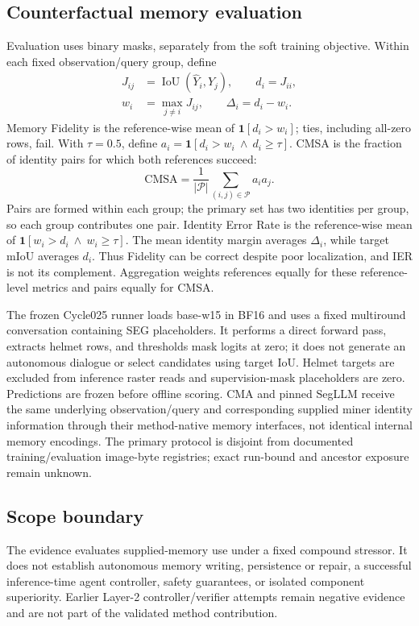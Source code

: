 \subsection{Counterfactual memory evaluation}
Evaluation uses binary masks, separately from the soft training objective.
Within each fixed observation/query group, define
\begin{align}
 J_{ij}&=\operatorname{IoU}(\hat Y_i,Y_j),\qquad d_i=J_{ii},\\
 w_i&=\max_{j\ne i}J_{ij},\qquad \Delta_i=d_i-w_i.
\end{align}
Memory Fidelity is the reference-wise mean of $\mathbf{1}[d_i>w_i]$;
ties, including all-zero rows, fail. With $\tau=0.5$, define
$a_i=\mathbf{1}[d_i>w_i\ \land\ d_i\geq\tau]$.
CMSA is the fraction of identity pairs for which both references succeed:
\begin{equation}
 \mathrm{CMSA}=\frac{1}{|\mathcal P|}
 \sum_{(i,j)\in\mathcal P}a_i a_j.
\end{equation}
Pairs are formed within each group; the primary set has two identities per
group, so each group contributes one pair. Identity Error Rate is the
reference-wise mean of $\mathbf{1}[w_i>d_i\ \land\ w_i\geq\tau]$.
The mean identity margin averages $\Delta_i$, while target mIoU averages $d_i$.
Thus Fidelity can be correct despite poor localization, and IER is not its
complement. Aggregation weights references equally for these reference-level
metrics and pairs equally for CMSA.

The frozen Cycle025 runner loads base-w15 in BF16 and uses a fixed multiround
conversation containing SEG placeholders. It performs a direct forward pass,
extracts helmet rows, and thresholds mask logits at zero; it does not generate
an autonomous dialogue or select candidates using target IoU. Helmet targets
are excluded from inference raster reads and supervision-mask placeholders
are zero. Predictions are frozen before offline scoring. CMA and pinned
SegLLM receive the same underlying observation/query and corresponding supplied
miner identity information through their method-native memory interfaces,
not identical internal memory encodings. The primary protocol is disjoint
from documented training/evaluation image-byte registries; exact run-bound
and ancestor exposure remain unknown.

\subsection{Scope boundary}
The evidence evaluates supplied-memory use under a fixed compound stressor.
It does not establish autonomous memory writing, persistence or repair, a
successful inference-time agent controller, safety guarantees, or isolated
component superiority. Earlier Layer-2 controller/verifier attempts remain
negative evidence and are not part of the validated method contribution.
